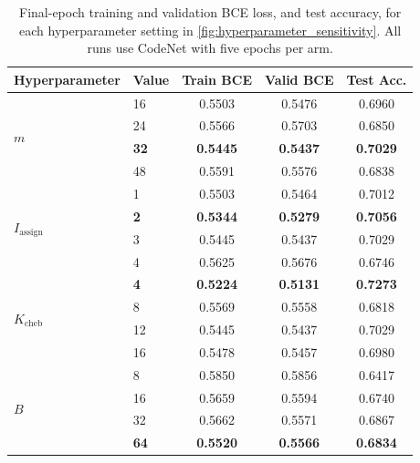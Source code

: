 \begin{table}[!htbp]
\centering
\caption{Final-epoch training and validation BCE loss, and test accuracy, for each hyperparameter setting in \autoref{fig:hyperparameter_sensitivity}. All runs use CodeNet with five epochs per arm.}
\label{tab:d1_sensitivity}
\scriptsize
\setlength{\tabcolsep}{4.2pt}
\renewcommand{\arraystretch}{1.05}
\begin{tabular}{@{}llccc@{}}
\toprule
\textbf{Hyperparameter} & \textbf{Value} & \textbf{Train BCE} & \textbf{Valid BCE} & \textbf{Test Acc.} \\
\midrule
\multirow{4}{*}{$m$} & 16 & 0.5503 & 0.5476 & 0.6960 \\
 & 24 & 0.5566 & 0.5703 & 0.6850 \\
 & \textbf{32} & \textbf{0.5445} & \textbf{0.5437} & \textbf{0.7029} \\
 & 48 & 0.5591 & 0.5576 & 0.6838 \\
\midrule
\multirow{4}{*}{$I_{\mathrm{assign}}$} & 1 & 0.5503 & 0.5464 & 0.7012 \\
 & \textbf{2} & \textbf{0.5344} & \textbf{0.5279} & \textbf{0.7056} \\
 & 3 & 0.5445 & 0.5437 & 0.7029 \\
 & 4 & 0.5625 & 0.5676 & 0.6746 \\
\midrule
\multirow{4}{*}{$K_{\mathrm{cheb}}$} & \textbf{4} & \textbf{0.5224} & \textbf{0.5131} & \textbf{0.7273} \\
 & 8 & 0.5569 & 0.5558 & 0.6818 \\
 & 12 & 0.5445 & 0.5437 & 0.7029 \\
 & 16 & 0.5478 & 0.5457 & 0.6980 \\
\midrule
\multirow{4}{*}{$B$} & 8 & 0.5850 & 0.5856 & 0.6417 \\
 & 16 & 0.5659 & 0.5594 & 0.6740 \\
 & 32 & 0.5662 & 0.5571 & 0.6867 \\
 & \textbf{64} & \textbf{0.5520} & \textbf{0.5566} & \textbf{0.6834} \\
\bottomrule
\end{tabular}
\end{table}
